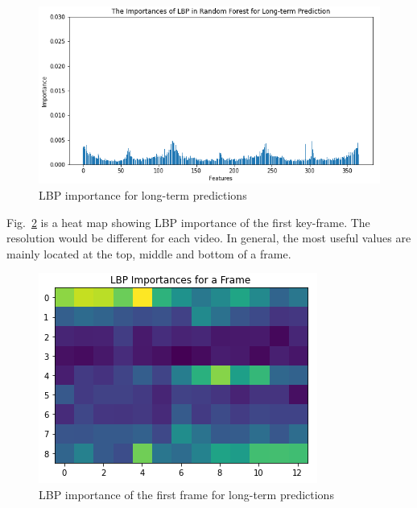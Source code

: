 \documentclass[conference, compsoc]{IEEEtran}
\begin{document}
{\begin{figure}[htbp]
    \centerline{\includegraphics[width=\linewidth]{figures/lbp-long-importance.png}}
    \caption{LBP importance for long-term predictions}
    \label{fig:lbp-long-importance}
\end{figure}

Fig.~\ref{fig:lbp-long-importance-for-a-frame} is a heat map showing LBP importance of the first key-frame.
The resolution would be different for each video.
In general, the most useful values are mainly located at the top, middle and bottom of a frame.

\begin{figure}[htbp]
    \centerline{\includegraphics[width=\linewidth]{figures/lbp-long-importance-for-a-frame.png}}
    \caption{LBP importance of the first frame for long-term predictions}
    \label{fig:lbp-long-importance-for-a-frame}
\end{figure}

}
\end{document}
